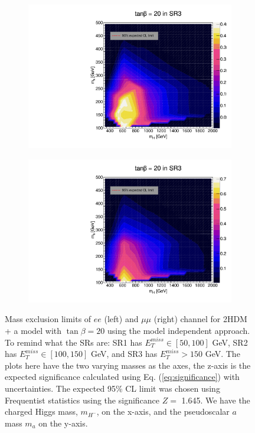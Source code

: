 \documentclass[12pt, a4paper]{book}
\begin{document}
\begin{figure}[!ht]
\begin{subfigure}[b]{0.49\textwidth}
      \includegraphics[width=1\textwidth]{Limits/Model_independent/150/2HDM/2HDM_ee_tb20.pdf}
   \end{subfigure}
   \hfill
   \begin{subfigure}[b]{0.49\textwidth}
      \centering
      \includegraphics[width=1\textwidth]{Limits/Model_independent/150/2HDM/2HDM_uu_tb20.pdf}
   \end{subfigure}
   \caption[Expected mass exclusion limits results for 2HDM + a model with $\tan\beta=20$ on $ee$ and $\mu\mu$ channel using the model independent approach]{Mass exclusion limits of $ee$ (left) and $\mu\mu$ (right) channel for 2HDM + a model with $\tan\beta=20$ using the model independent approach. To remind what the SRs are: SR1 has $E_T^{miss}\in[50, 100]$ GeV, SR2 has $E_T^{miss}\in[100, 150]$ GeV, and SR3 has $E_T^{miss}>150$ GeV. The plots here have the two varying masses as the axes, the z-axis is the expected significance calculated using Eq. (\ref{eq:significance}) with uncertainties. The expected 95\% CL limit was chosen using Frequentist statistics using the significance $Z=$ 1.645.   
   We have the charged Higgs mass, $m_{H^-}$, on the x-axis, and the pseudoscalar $a$ mass $m_{a}$ on the y-axis.}
\end{figure}
\end{document}
